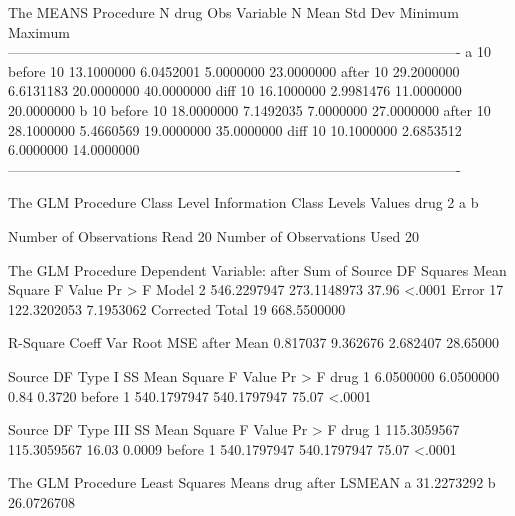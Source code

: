 \documentclass{article}
\begin{document}
\begin{Woutput}
The MEANS Procedure
              N
drug        Obs    Variable     N            Mean         Std Dev         Minimum         Maximum
-------------------------------------------------------------------------------------------------
a            10    before      10      13.1000000       6.0452001       5.0000000      23.0000000
                   after       10      29.2000000       6.6131183      20.0000000      40.0000000
                   diff        10      16.1000000       2.9981476      11.0000000      20.0000000
b            10    before      10      18.0000000       7.1492035       7.0000000      27.0000000
                   after       10      28.1000000       5.4660569      19.0000000      35.0000000
                   diff        10      10.1000000       2.6853512       6.0000000      14.0000000
-------------------------------------------------------------------------------------------------

The GLM Procedure
   Class Level Information
Class         Levels    Values
drug               2    a b

Number of Observations Read          20
Number of Observations Used          20

The GLM Procedure
Dependent Variable: after
                                        Sum of
Source                      DF         Squares     Mean Square    F Value    Pr > F
Model                        2     546.2297947     273.1148973      37.96    <.0001
Error                       17     122.3202053       7.1953062
Corrected Total             19     668.5500000

R-Square     Coeff Var      Root MSE    after Mean
0.817037      9.362676      2.682407      28.65000

Source                      DF       Type I SS     Mean Square    F Value    Pr > F
drug                         1       6.0500000       6.0500000       0.84    0.3720
before                       1     540.1797947     540.1797947      75.07    <.0001

Source                      DF     Type III SS     Mean Square    F Value    Pr > F
drug                         1     115.3059567     115.3059567      16.03    0.0009
before                       1     540.1797947     540.1797947      75.07    <.0001

The GLM Procedure
Least Squares Means
drug    after LSMEAN
a         31.2273292
b         26.0726708


\end{Woutput}
\end{document}
